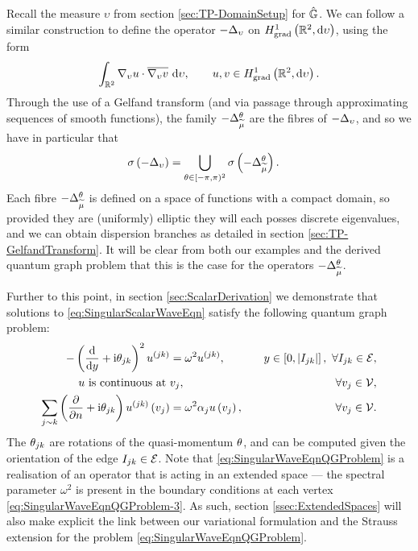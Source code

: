 Recall the measure $\upsilon$ from section \ref{sec:TP-DomainSetup} for $\hat{\mathbb{G}}$.
We can follow a similar construction to define the operator $-\Delta_{\upsilon}$ on $H^1_\mathrm{grad}\left( \mathbb{R}^2, \mathrm{d}\upsilon \right)$, using the form
\begin{align*}
	\int_{\mathbb{R}^2} \nabla_{\upsilon}u\cdot\overline{\nabla_{\upsilon}v}  \ \mathrm{d}\upsilon,
	\qquad u,v\in H^1_\mathrm{grad}\left( \mathbb{R}^2, \mathrm{d}\upsilon \right).
\end{align*}
Through the use of a Gelfand transform (and via passage through approximating sequences of smooth functions), the family $-\Delta_{\widetilde{\mu}}^{\theta}$ are the fibres of $-\Delta_{\upsilon}$, and so we have in particular that
\begin{align*}
	\sigma\left(  -\Delta_{\upsilon}  \right) &= \bigcup_{\theta\in[-\pi,\pi)^2} \sigma\left(  -\Delta_{\widetilde{\mu}}^{\theta}  \right).
\end{align*}
Each fibre $-\Delta_{\widetilde{\mu}}^{\theta}$ is defined on a space of functions with a compact domain, so provided they are (uniformly) elliptic they will each posses discrete eigenvalues, and we can obtain dispersion branches as detailed in section \ref{sec:TP-GelfandTransform}.
It will be clear from both our examples and the derived quantum graph problem that this is the case for the operators $-\Delta_{\widetilde{\mu}}^{\theta}$.

Further to this point, in section \ref{sec:ScalarDerivation} we demonstrate that solutions to \eqref{eq:SingularScalarWaveEqn} satisfy the following quantum graph problem:
\begin{subequations} \label{eq:SingularWaveEqnQGProblem}
	\begin{align}
		-\left( \dfrac{\mathrm{d}}{\mathrm{d}y} + \mathrm{i}\theta_{jk} \right)^2 u^{(jk)} &= \omega^2 u^{(jk)}, \quad &y\in\left[ 0,\left\lvert I_{jk} \right\rvert \right], \ \forall I_{jk}\in\mathcal{E}, \label{eq:SingularWaveEqnQGProblem-1} \\
		u \text{ is continuous at } & v_j, \quad &\forall v_j\in\mathcal{V}, \label{eq:SingularWaveEqnQGProblem-2} \\
		\sum_{j\sim k}\left( \dfrac{\partial }{\partial n} + \mathrm{i}\theta_{jk} \right)u^{(jk)}\left( v_j \right) &= \omega^2\alpha_j u\left( v_j \right), \quad &\forall v_j\in\mathcal{V}. \label{eq:SingularWaveEqnQGProblem-3}
	\end{align}
\end{subequations}
The $\theta_{jk}$ are rotations of the quasi-momentum $\theta$, and can be computed given the orientation of the edge $I_{jk}\in\mathcal{E}$.
Note that \eqref{eq:SingularWaveEqnQGProblem} is a realisation of an operator that is acting in an extended space --- the spectral parameter $\omega^2$ is present in the boundary conditions at each vertex \eqref{eq:SingularWaveEqnQGProblem-3}.
As such, section \ref{ssec:ExtendedSpaces} will also make explicit the link between our variational formulation and the Strauss extension for the problem \eqref{eq:SingularWaveEqnQGProblem}.

